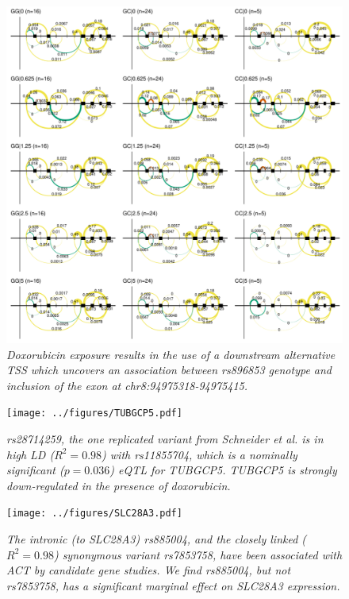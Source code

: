 \documentclass{article}
\begin{document}
\begin{figure}[h]
\begin{center}
    \includegraphics[width=1\textwidth]{../figures/NDUFAF6.pdf} %
    \caption{\it{Doxorubicin exposure results in the use of a downstream alternative TSS which uncovers an association between rs896853 genotype and inclusion of the exon at chr8:94975318-94975415.}}
    \label{fig:NDUFAF6}
    \end{center}
\end{figure}

\begin{figure}[h]
\begin{center}
    \texttt{[image: ../figures/TUBGCP5.pdf]} %
    \caption{\it{rs28714259, the one replicated variant from Schneider et al.\cite{Schneider2016} is in high LD ($R^2=0.98$) with rs11855704, which is a nominally significant ($p=0.036$) eQTL for \emph{TUBGCP5}. \emph{TUBGCP5} is strongly down-regulated in the presence of doxorubicin.}}
    \label{fig:TUBGCP5}
    \end{center}
\end{figure}

\begin{figure}[h]
\begin{center}
    \texttt{[image: ../figures/SLC28A3.pdf]} %
    \caption{\it{The intronic (to SLC28A3) rs885004, and the closely linked ($R^2=0.98$) synonymous variant rs7853758, have been associated with ACT by candidate gene studies\cite{Visscher2012-xl,Visscher2013-zs}. We find rs885004, but not rs7853758, has a significant marginal effect on SLC28A3 expression.}}
    \label{fig:SLC28A3}
    \end{center}
\end{figure}
\end{document}
